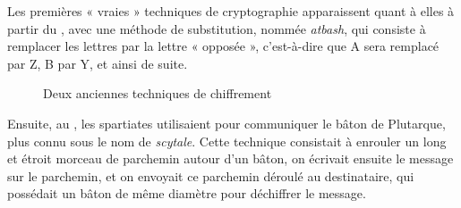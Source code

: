 Les premières « vraies » techniques de cryptographie apparaissent
quant à elles à partir du , avec une méthode de substitution,
nommée \emph{atbash}, qui consiste à remplacer les lettres par la
lettre « opposée », c'est-à-dire que A sera remplacé par Z, B par Y,
et ainsi de suite.
\begin{figure}[h]
  \centering
    \hspace{1.5cm}
    \caption{Deux anciennes techniques de chiffrement}
    \vspace{-15pt}
\end{figure}


  
Ensuite, au , les spartiates utilisaient pour communiquer le
bâton de Plutarque, plus connu sous le nom de \emph{scytale}. Cette
technique consistait à enrouler un long et étroit morceau de parchemin
autour d'un bâton, on écrivait ensuite le message sur le parchemin, et
on envoyait ce parchemin déroulé au destinataire, qui possédait un
bâton de même diamètre pour déchiffrer le message.

